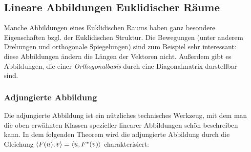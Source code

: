 \subsection{Lineare Abbildungen Euklidischer Räume}

Manche Abbildungen eines Euklidischen Raums haben ganz besondere Eigenschaften bzgl. der Euklidischen Struktur. Die Bewegungen (unter anderem Drehungen und orthogonale Spiegelungen) sind zum Beispiel sehr interessant: diese Abbildungen ändern die Längen der Vektoren nicht. Außerdem gibt es Abbildungen, die einer \emph{Orthogonalbasis} durch eine Diagonalmatrix darstellbar sind. 

\subsubsection{Adjungierte Abbildung}

Die adjungierte Abbildung ist ein nützliches technisches Werkzeug, mit dem man die oben erwähnten Klassen spezieller linearer Abbildungen schön beschreiben kann. In dem folgenden Theorem wird die adjungierte Abbildung durch die Gleichung $\left\langle F(u),v \right\rangle = \left\langle u,F^\ast(v) \right\rangle$ charakterisiert: 

